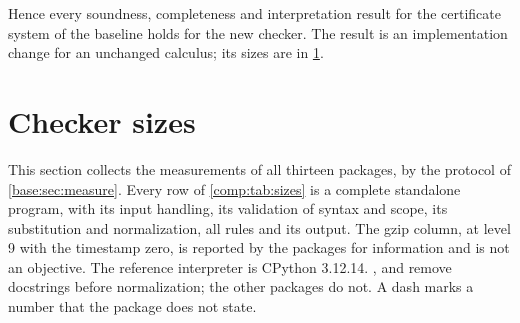 Hence every soundness, completeness and interpretation result for the
certificate system of the baseline holds for the new checker. The result is
an implementation change for an unchanged calculus; its sizes are in
\cref{comp:sec:sizes}.

\section{Checker sizes}
\label{comp:sec:sizes}

This section collects the measurements of all thirteen packages, by the protocol
of \cref{base:sec:measure}. Every row of \cref{comp:tab:sizes} is a complete
standalone program, with its input handling, its validation of syntax and
scope, its substitution and normalization, all rules and its output. The
gzip column, at level 9 with the timestamp zero, is reported by the packages
for information and is not an objective. The reference interpreter is
CPython 3.12.14. ,  and
 remove docstrings before normalization; the
other packages do not. A dash marks a number that the package does not
state.

